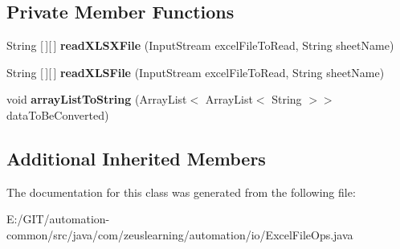 \subsection*{Private Member Functions}
\begin{DoxyCompactItemize}
\item 
\hypertarget{classcom_1_1zeuslearning_1_1automation_1_1io_1_1ExcelFileOps_a08ec32dfb1a4332c01e34225770f9b93}{}\label{classcom_1_1zeuslearning_1_1automation_1_1io_1_1ExcelFileOps_a08ec32dfb1a4332c01e34225770f9b93} 
String \mbox{[}$\,$\mbox{]}\mbox{[}$\,$\mbox{]} {\bfseries read\+X\+L\+S\+X\+File} (Input\+Stream excel\+File\+To\+Read, String sheet\+Name)
\item 
\hypertarget{classcom_1_1zeuslearning_1_1automation_1_1io_1_1ExcelFileOps_a67e01e63c70eb1b038449e48a56dfc91}{}\label{classcom_1_1zeuslearning_1_1automation_1_1io_1_1ExcelFileOps_a67e01e63c70eb1b038449e48a56dfc91} 
String \mbox{[}$\,$\mbox{]}\mbox{[}$\,$\mbox{]} {\bfseries read\+X\+L\+S\+File} (Input\+Stream excel\+File\+To\+Read, String sheet\+Name)
\item 
\hypertarget{classcom_1_1zeuslearning_1_1automation_1_1io_1_1ExcelFileOps_a58a5c2e179916979749dd3a74f6f3824}{}\label{classcom_1_1zeuslearning_1_1automation_1_1io_1_1ExcelFileOps_a58a5c2e179916979749dd3a74f6f3824} 
void {\bfseries array\+List\+To\+String} (Array\+List$<$ Array\+List$<$ String $>$$>$ data\+To\+Be\+Converted)
\end{DoxyCompactItemize}
\subsection*{Additional Inherited Members}


The documentation for this class was generated from the following file\+:\begin{DoxyCompactItemize}
\item 
E\+:/\+G\+I\+T/automation-\/common/src/java/com/zeuslearning/automation/io/Excel\+File\+Ops.\+java\end{DoxyCompactItemize}
